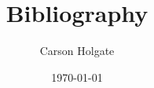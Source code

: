\documentclass[11pt]{article}
\begin{document}
\title{Bibliography}
\author{Carson Holgate}
\date{\today}
\maketitle



\nocite{*}
\end{document}
